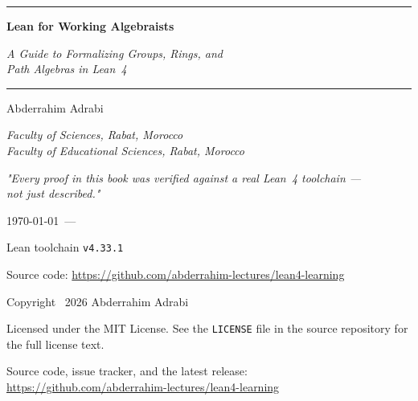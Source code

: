 \begin{titlepage}
\centering
\vspace*{2cm}

{\color{ruleblue}\rule{0.6\textwidth}{1.2pt}}\par
\vspace{0.6cm}

{\normalfont\Huge\bfseries Lean for Working Algebraists\par}
\vspace{0.5cm}
{\normalfont\Large\itshape A Guide to Formalizing Groups, Rings, and\\[2pt]
Path Algebras in Lean~4\par}

\vspace{0.6cm}
{\color{ruleblue}\rule{0.6\textwidth}{1.2pt}}\par

\vspace{2.5cm}
{\normalfont\Large Abderrahim Adrabi\par}
\vspace{0.2cm}
{\normalfont\normalsize\itshape Faculty of Sciences, Rabat, Morocco\\
Faculty of Educational Sciences, Rabat, Morocco\par}

\vfill

{\normalfont\large\itshape "Every proof in this book was verified against
a real Lean~4 toolchain --- \\
not just described."\par}

\vspace{1.5cm}
{\normalfont\normalsize \today\ --- \bookversion\par}
{\normalfont\small Lean toolchain \texttt{v4.33.1}\par}
\vspace{0.3cm}
{\normalfont\small Source code:
\url{https://github.com/abderrahim-lectures/lean4-learning}\par}

\end{titlepage}

\clearpage
\thispagestyle{empty}
\null\vfill
\begin{center}
{\normalfont\small
Copyright \textcopyright\ 2026 Abderrahim Adrabi\par
\vspace{0.4cm}
Licensed under the MIT License. See the \texttt{LICENSE} file in the
source repository for the full license text.\par
\vspace{0.4cm}
Source code, issue tracker, and the latest release:\\
\url{https://github.com/abderrahim-lectures/lean4-learning}\par
}
\end{center}
\vfill\null
\clearpage

